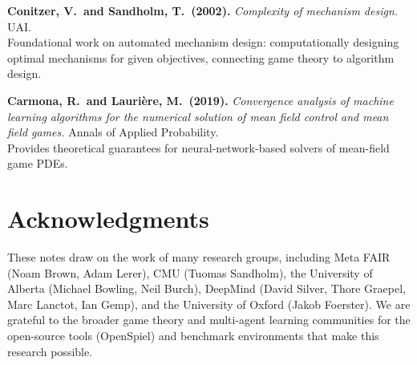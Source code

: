 \documentclass[11pt,a4paper]{article}
\theoremstyle{plain}
\theoremstyle{definition}
\begin{document}
\begin{enumerate}[label={[\arabic*]}, leftmargin=*, itemsep=6pt]
\item \textbf{Conitzer, V.\ and Sandholm, T.\ (2002).}  \emph{Complexity
  of mechanism design.}  UAI.\\
  Foundational work on automated mechanism design: computationally
  designing optimal mechanisms for given objectives, connecting game
  theory to algorithm design.

\item \textbf{Carmona, R.\ and Lauri\`ere, M.\ (2019).}  \emph{Convergence
  analysis of machine learning algorithms for the numerical solution of
  mean field control and mean field games.}  Annals of Applied
  Probability.\\
  Provides theoretical guarantees for neural-network-based solvers of
  mean-field game PDEs.

\end{enumerate}

\section*{Acknowledgments}

These notes draw on the work of many research groups, including Meta FAIR
(Noam Brown, Adam Lerer), CMU (Tuomas Sandholm), the University of
Alberta (Michael Bowling, Neil Burch), DeepMind (David Silver, Thore
Graepel, Marc Lanctot, Ian Gemp), and the University of Oxford (Jakob
Foerster).  We are grateful to the broader game theory and multi-agent
learning communities for the open-source tools (OpenSpiel) and benchmark
environments that make this research possible.
\end{document}
